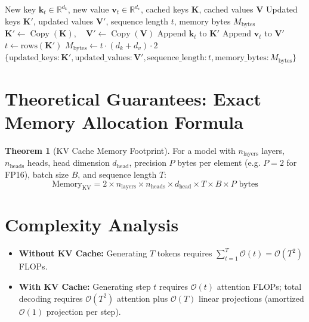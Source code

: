 \documentclass[11pt,a4paper]{article}
\theoremstyle{definition}
\newtheorem{theorem}{Theorem}[section]
\begin{document}
\begin{algorithm}[H]
\caption{KV Cache State Append and Memory Tracking}
\label{alg:kv_cache}
\begin{algorithmic}[1]
\Require New key $\mathbf{k}_t \in \mathbb{R}^{d_k}$, new value $\mathbf{v}_t \in \mathbb{R}^{d_v}$, cached keys $\mathbf{K}$, cached values $\mathbf{V}$
\Ensure Updated keys $\mathbf{K}'$, updated values $\mathbf{V}'$, sequence length $t$, memory bytes $M_{\text{bytes}}$
\State $\mathbf{K}' \gets \operatorname{Copy}(\mathbf{K}), \quad \mathbf{V}' \gets \operatorname{Copy}(\mathbf{V})$
\State Append $\mathbf{k}_t$ to $\mathbf{K}'$
\State Append $\mathbf{v}_t$ to $\mathbf{V}'$
\State $t \gets \text{rows}(\mathbf{K}')$
\State $M_{\text{bytes}} \gets t \cdot (d_k + d_v) \cdot 2$ 
\State \Return $\{\text{updated\_keys}: \mathbf{K}', \text{updated\_values}: \mathbf{V}', \text{sequence\_length}: t, \text{memory\_bytes}: M_{\text{bytes}}\}$
\end{algorithmic}
\end{algorithm}

\section{Theoretical Guarantees: Exact Memory Allocation Formula}

\begin{theorem}[KV Cache Memory Footprint]
For a model with $n_{\text{layers}}$ layers, $n_{\text{heads}}$ heads, head dimension $d_{\text{head}}$, precision $P$ bytes per element (e.g. $P=2$ for FP16), batch size $B$, and sequence length $T$:
\begin{equation}
\text{Memory}_{\text{KV}} = 2 \times n_{\text{layers}} \times n_{\text{heads}} \times d_{\text{head}} \times T \times B \times P \text{ bytes}
\end{equation}
\end{theorem}

\section{Complexity Analysis}
\begin{itemize}
    \item \textbf{Without KV Cache:} Generating $T$ tokens requires $\sum_{t=1}^T \mathcal{O}(t) = \mathcal{O}(T^2)$ FLOPs.
    \item \textbf{With KV Cache:} Generating step $t$ requires $\mathcal{O}(t)$ attention FLOPs; total decoding requires $\mathcal{O}(T^2)$ attention plus $\mathcal{O}(T)$ linear projections (amortized $\mathcal{O}(1)$ projection per step).
\end{itemize}
\end{document}

